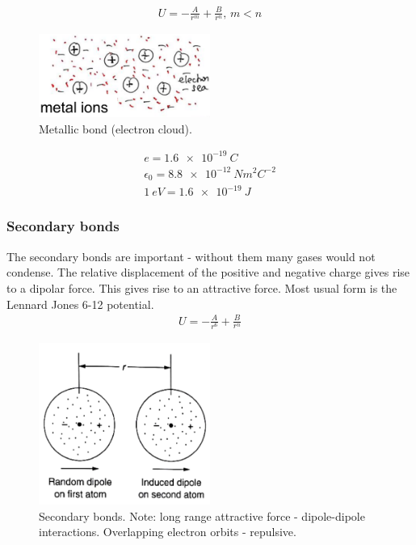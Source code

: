 \begin{gather}
	U = -\frac{A}{r^m} + \frac{B}{r^n}, \, m<n
\end{gather}
\begin{figure}[H]
	\centering
	\includegraphics[width = 0.5\textwidth]{./img/figure10.png}
	\caption{Metallic bond (electron cloud).}
\end{figure}
\begin{gather}
	e = \SI{1.6e-19}{C}\\
	\epsilon_0 = \SI{8.8e-12}{Nm^2C^{-2}}\\
	\SI{1}{eV} = \SI{1.6e-19}{J}
\end{gather}
\subsubsection{Secondary bonds}
The secondary bonds are important - without them many gases would not condense. The relative displacement of the positive and negative charge gives rise to a dipolar force. This gives rise to an attractive force. Most usual form is the Lennard Jones 6-12 potential.
\begin{gather}
	U = -\frac{A}{r^6} + \frac{B}{r^n}
\end{gather}
\begin{figure}[H]
	\centering
	\includegraphics[width = 0.5\textwidth]{./img/figure11.png}
	\caption{Secondary bonds. Note: long range attractive force -  dipole-dipole interactions. Overlapping electron orbits - repulsive.}
\end{figure}
